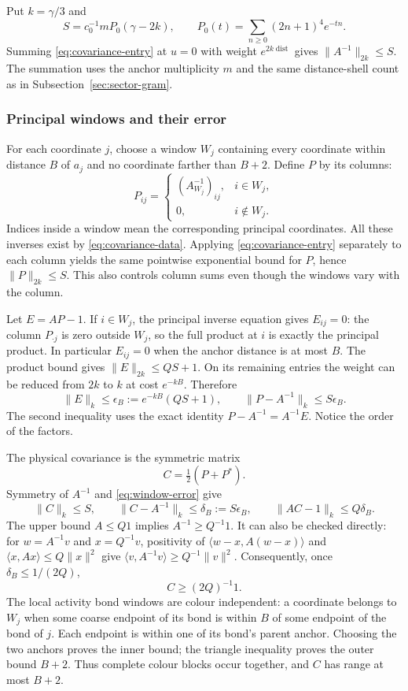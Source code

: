 Put $k=\gamma/3$ and
\[
 S=c_0^{-1}mP_0(\gamma-2k),\qquad
 P_0(t)=\sum_{n\ge0}(2n+1)^4e^{-tn}.
\]
Summing \eqref{eq:covariance-entry} at $u=0$ with weight
$e^{2k\operatorname{dist}}$ gives $\|A^{-1}\|_{2k}\le S$.
The summation uses the anchor multiplicity $m$ and the same
distance-shell count as in Subsection~\ref{sec:sector-gram}.

\subsubsection{Principal windows and their error}
For each coordinate $j$, choose a window $W_j$ containing every
coordinate within distance $B$ of $a_j$ and no coordinate farther
than $B+2$. Define $P$ by its columns:
\[
 P_{ij}=\begin{cases}
 (A_{W_j}^{-1})_{ij},&i\in W_j,\\
 0,&i\notin W_j.
 \end{cases}
\]
Indices inside a window mean the corresponding principal coordinates.
All these inverses exist by \eqref{eq:covariance-data}. Applying
\eqref{eq:covariance-entry} separately to each column yields the
same pointwise exponential bound for $P$, hence
$\|P\|_{2k}\le S$. This also controls column sums even though
the windows vary with the column.

Let $E=AP-1$. If $i\in W_j$, the principal inverse equation
gives $E_{ij}=0$: the column $P_{\cdot j}$ is zero outside
$W_j$, so the full product at $i$ is exactly the principal product.
In particular $E_{ij}=0$ when the anchor distance is at most $B$.
The product bound gives $\|E\|_{2k}\le QS+1$.
On its remaining entries the weight can be reduced from $2k$ to
$k$ at cost $e^{-kB}$. Therefore
\begin{equation}\label{eq:window-error}
 \|E\|_k\le\epsilon_B:=e^{-kB}(QS+1),\qquad
 \|P-A^{-1}\|_k\le S\epsilon_B.
\end{equation}
The second inequality uses the exact identity
$P-A^{-1}=A^{-1}E$. Notice the order of the factors.

The physical covariance is the symmetric matrix
\begin{equation}\label{eq:local-covariance}
 C=\tfrac12(P+P^*).
\end{equation}
Symmetry of $A^{-1}$ and \eqref{eq:window-error} give
\[
 \|C\|_k\le S,\qquad
 \|C-A^{-1}\|_k\le\delta_B:=S\epsilon_B,
 \qquad \|AC-1\|_k\le Q\delta_B.
\]
The upper bound $A\le Q1$ implies $A^{-1}\ge Q^{-1}1$.
It can also be checked directly: for $w=A^{-1}v$ and
$x=Q^{-1}v$, positivity of
$\langle w-x,A(w-x)\rangle$ and
$\langle x,Ax\rangle\le Q\|x\|^2$ give
$\langle v,A^{-1}v\rangle\ge Q^{-1}\|v\|^2$.
Consequently, once $\delta_B\le1/(2Q)$,
\begin{equation}\label{eq:local-covariance-floor}
 C\ge(2Q)^{-1}1.
\end{equation}
The local activity bond windows are colour independent: a coordinate
belongs to $W_j$ when some coarse endpoint of its bond is within $B$ of
some endpoint of the bond of $j$. Each endpoint is within one of its
bond's parent anchor. Choosing the two anchors proves the inner bound;
the triangle inequality proves the outer bound $B+2$. Thus complete
colour blocks occur together, and $C$ has range at most $B+2$.

